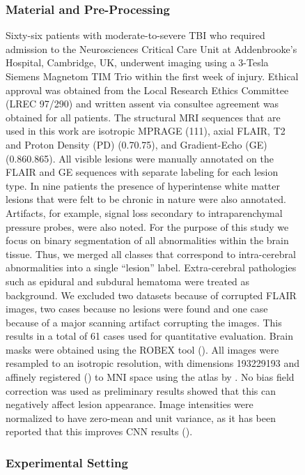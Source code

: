 \documentclass[preprint,authoryear,12pt]{elsarticle}
\newcommand{\quot}[1]{``#1''}
\newcommand{\ignore}[1]{}
\begin{document}
\begin{figure}[h]
\subsubsection{Material and Pre-Processing}
\label{subsubsec:materialTbi}

Sixty-six patients  with moderate-to-severe TBI who required admission to the Neurosciences Critical Care Unit at Addenbrooke's Hospital, Cambridge, UK, underwent imaging using a 3-Tesla Siemens Magnetom TIM Trio within the first week of injury. Ethical approval was obtained from the Local Research Ethics Committee (LREC 97/290) and written assent via consultee agreement was obtained for all patients. The structural MRI sequences that are used in this work are isotropic MPRAGE (111), axial FLAIR, T2 and Proton Density (PD) (0.70.75), and Gradient-Echo (GE) (0.860.865). All visible lesions were manually annotated on the FLAIR and GE sequences with separate labeling for each lesion type. In nine patients the presence of hyperintense white matter lesions that were felt to be chronic in nature were also annotated. Artifacts, for example, signal loss secondary to intraparenchymal pressure probes, were also noted. For the purpose of this study we focus on binary segmentation of all abnormalities within the brain tissue. Thus, we merged all classes that correspond to intra-cerebral abnormalities into a single \quot{lesion} label. Extra-cerebral pathologies such as epidural and subdural hematoma were treated as background. We excluded two datasets because of corrupted FLAIR images\ignore{13296, 17792}, two cases because no lesions were found\ignore{13776, 15883} and one case \ignore{11976} because of a major scanning artifact corrupting the images. This results in a total of 61 cases used for quantitative evaluation. Brain masks were obtained using the ROBEX tool (\cite{Iglesias2011}). All images were resampled to an isotropic  resolution, with dimensions 193229193 and affinely registered (\cite{Studholme1999}) to MNI space using the atlas by \cite{Grabner2006}. No bias field correction was used as preliminary results showed that this can negatively affect lesion appearance. Image intensities were normalized to have zero-mean and unit variance, as it has been reported that this improves CNN results (\cite{Jarrett2009}).

\subsubsection{Experimental Setting}
\label{subsubsec:tbiExperimentalSetting}


\end{figure}
\end{document}
